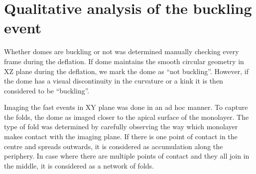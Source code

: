 \section{Qualitative analysis of the buckling event}

Whether domes are buckling or not was determined manually checking every frame during the deflation. If dome maintains the smooth circular geometry in XZ plane during the deflation, we mark the dome as “not buckling”. However, if the dome has a visual discontinuity in the curvature or a kink it is then considered to be “buckling”.

Imaging the fast events in XY plane was done in an ad hoc manner. To capture the folds, the dome as imaged closer to the apical surface of the monolayer. The type of fold was determined by carefully observing the way which monolayer makes contact with the imaging plane. If there is one point of contact in the centre and spreads outwards, it is considered as accumulation along the periphery. In case where there are multiple points of contact and they all join in the middle, it is considered as a network of folds.
